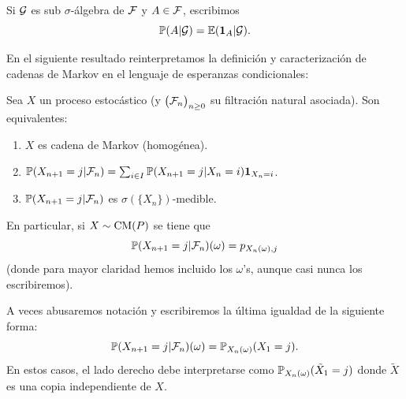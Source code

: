 \begin{notation}
Si $\mathcal{G}$ es sub $\sigma$-álgebra de $\mathcal{F}$ y $A\in\mathcal{F}$, escribimos 
\[\mathbb{P}(A|\mathcal{G})=\mathbb{E}(\mathbf{1}_{A}|\mathcal{G}).\]
\end{notation}

En el siguiente resultado reinterpretamos la definición y caracterización de cadenas de Markov en el lenguaje de esperanzas condicionales:

\begin{prop}\label{prop:markov22}
Sea $X$ un proceso estocástico (y $\big(\mathcal{F}_n\big)_{n\geq0}$ su filtración natural asociada).
Son equivalentes:
\begin{enumerate}[label=\uptext{(\roman*)}]
\item $X$ es cadena de Markov (homogénea).
\item $\mathbb{P}(X_{n+1}=j|\mathcal{F}_n)=\sum_{i\in I}\mathbb{P}(X_{n+1}=j|X_n=i)\mathbf{1}_{X_n=i}$.
\item $\mathbb{P}(X_{n+1}=j|\mathcal{F}_n)$ es $\sigma(\{X_n\})$-medible.
\end{enumerate}	
En particular, si $X\sim\text{\upshape{CM}}(P)$ se tiene que
\[\mathbb{P}(X_{n+1}=j|\mathcal{F}_n)(\omega)=p_{X_n(\omega),j}\]
(donde para mayor claridad hemos incluido los $\omega$'s, aunque casi nunca los escribiremos).
\end{prop}

\begin{rem}\label{rem:abusonot}
A veces abusaremos notación y escribiremos la última igualdad de la siguiente forma:
\[\mathbb{P}(X_{n+1}=j|\mathcal{F}_n)(\omega)=\mathbb{P}_{X_n(\omega)}(X_1=j).\]
En estos casos, el lado derecho debe interpretarse como $\mathbb{P}_{X_n(\omega)}(\tilde X_1=j)$ donde $\tilde X$ es una copia independiente de $X$.
\end{rem}

